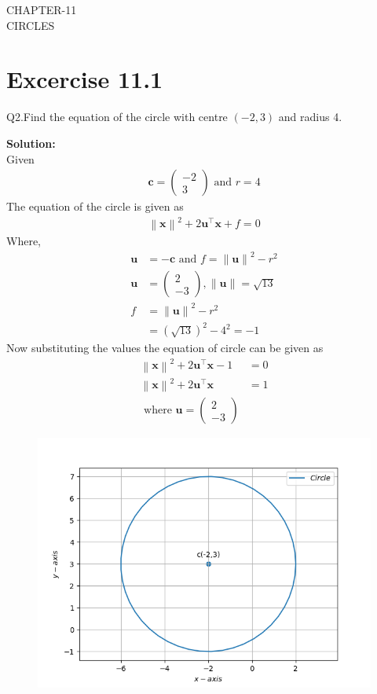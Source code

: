 \documentclass[12pt]{article}
\providecommand{\norm}[1]{\left\lVert#1\right\rVert}
\newcommand{\solution}{\noindent \textbf{Solution: }}
\newcommand{\myvec}[1]{\ensuremath{\begin{pmatrix}#1\end{pmatrix}}}
\let\vec\mathbf
\begin{document}
\begin{center}
\textbf\large{CHAPTER-11 \\ CIRCLES}

\end{center}
\section*{Excercise 11.1}

Q2.Find the equation of the circle with centre $(-2,3)$ and radius 4.

\solution
\\
Given
\begin{align}
	\vec{c} = \myvec{-2\\3} \text{ and } r = 4
\end{align}
The equation of the circle is given as
\begin{align}
	\norm{\vec{x}}^{2} + 2\vec{u}^{\top}\vec{x} + f = 0
\end{align}
Where,
\begin{align}
	\vec{u} &= -\vec{c} \text{ and } f = \norm{\vec{u}}^{2} - r^{2}\\
	\vec{u} &= \myvec{2\\-3},\norm{\vec{u}} = \sqrt{13}\\
	f &= \norm{\vec{u}}^2 - r^2\\
	&= (\sqrt{13})^2 - 4^2= -1
\end{align}
Now substituting the values the equation of circle can be given as
\begin{align}
	\norm{\vec{x}}^2 + 2\vec{u}^\top\vec{x}-1 &= 0\\
	\norm{\vec{x}}^2 + 2\vec{u}^\top\vec{x} &= 1\\
	\text{ where } \vec{u} = \myvec{2\\-3}        		       
\end{align}	
\begin{figure}[!h]
	\begin{center} 
	    \includegraphics[width=\columnwidth]{figs/circle.png}
	\end{center}
\caption{}
\label{fig:Fig1}
\end{figure}
\end{document}
